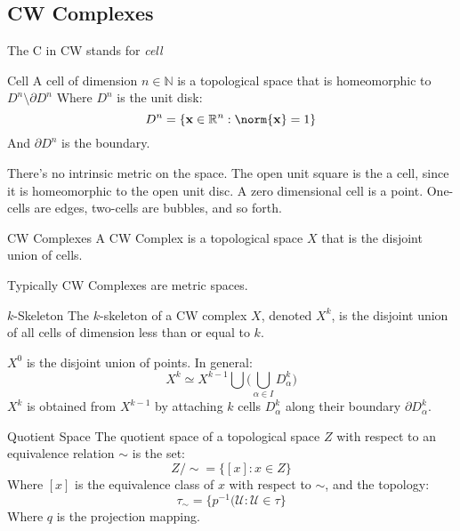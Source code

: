 \documentclass[crop=false,class=book,oneside]{standalone}
\begin{document}
        \subsection{CW Complexes}
            The C in CW stands for \textit{cell}
            \begin{ldefinition}{Cell}
                A cell of dimension $n\in\mathbb{N}$ is
                a topological space that is homeomorphic
                to $D^{n}\setminus\partial{D}^{n}$
                Where $D^{n}$ is the unit disk:
                \begin{equation}
                    D^{n}=\{\mathbf{x}\in\mathbb{R}^{n}:
                    \norm{\mathbf{x}}=1\}
                \end{equation}
                And $\partial{D}^{n}$ is the boundary.
            \end{ldefinition}
            There's no intrinsic metric on the space.
            The open unit square is the a cell, since
            it is homeomorphic to the open unit disc.
            A zero dimensional cell is a point.
            One-cells are edges, two-cells are
            bubbles, and so forth.
            \begin{ldefinition}{CW Complexes}
                A CW Complex is a topological space
                $X$ that is the disjoint union of
                cells.
            \end{ldefinition}
            Typically CW Complexes are metric spaces.
            \begin{ldefinition}{$k$-Skeleton}
                The $k$-skeleton of a CW complex $X$,
                denoted $X^{k}$,
                is the disjoint union of all cells of
                dimension less than or equal to $k$.
            \end{ldefinition}
            $X^{0}$ is the disjoint union of points.
            In general:
            \begin{equation}
                X^{k}\simeq{X}^{k-1}\bigcup\Big(
                    \bigcup_{\alpha\in{I}}D_{\alpha}^{k}
                \Big)
            \end{equation}
            $X^{k}$ is obtained from $X^{k-1}$ by
            attaching $k$ cells $D_{\alpha}^{k}$ along
            their boundary $\partial{D}_{\alpha}^{k}$.
            \begin{ldefinition}{Quotient Space}
                The quotient space of a topological
                space $Z$ with respect to an equivalence
                relation $\sim$ is the set:
                \begin{equation}
                    Z/\sim=\{[x]:x\in{Z}\}
                \end{equation}
                Where $[x]$ is the equivalence class of
                $x$ with respect to $\sim$, and the
                topology:
                \begin{equation}
                    \tau_{\sim}=
                    \{p^{-1}(\mathcal{U}:
                    \mathcal{U}\in\tau\}
                \end{equation}
                Where $q$ is the projection mapping.
            \end{ldefinition}
\end{document}
